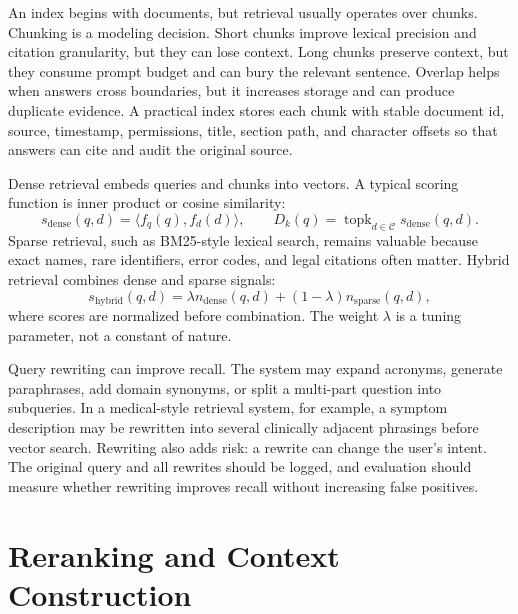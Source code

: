 An index begins with documents, but retrieval usually operates over chunks. Chunking is a modeling decision. Short chunks improve lexical precision and citation granularity, but they can lose context. Long chunks preserve context, but they consume prompt budget and can bury the relevant sentence. Overlap helps when answers cross boundaries, but it increases storage and can produce duplicate evidence. A practical index stores each chunk with stable document id, source, timestamp, permissions, title, section path, and character offsets so that answers can cite and audit the original source.

Dense retrieval embeds queries and chunks into vectors. A typical scoring function is inner product or cosine similarity:
\begin{equation}
  s_{\mathrm{dense}}(q,d) =
  \langle f_q(q), f_d(d) \rangle,
  \qquad
  D_k(q)=\operatorname{topk}_{d\in \mathcal{C}} s_{\mathrm{dense}}(q,d).
  \label{eq:dense-retrieval}
\end{equation}
Sparse retrieval, such as BM25-style lexical search, remains valuable because exact names, rare identifiers, error codes, and legal citations often matter. Hybrid retrieval combines dense and sparse signals:
\begin{equation}
  s_{\mathrm{hybrid}}(q,d) =
  \lambda n_{\mathrm{dense}}(q,d)
  + (1-\lambda)n_{\mathrm{sparse}}(q,d),
  \label{eq:hybrid-score}
\end{equation}
where scores are normalized before combination. The weight $\lambda$ is a tuning parameter, not a constant of nature.

Query rewriting can improve recall. The system may expand acronyms, generate paraphrases, add domain synonyms, or split a multi-part question into subqueries. In a medical-style retrieval system, for example, a symptom description may be rewritten into several clinically adjacent phrasings before vector search. Rewriting also adds risk: a rewrite can change the user's intent. The original query and all rewrites should be logged, and evaluation should measure whether rewriting improves recall without increasing false positives.

\section{Reranking and Context Construction}
\label{sec:reranking-context}

